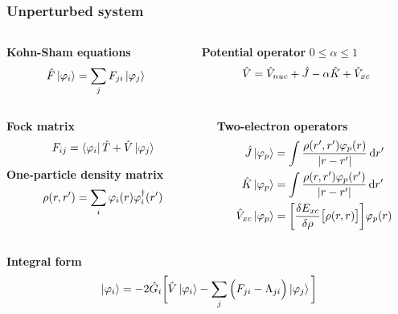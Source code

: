 \begin{frame}
    \frametitle{Unperturbed system}
    \begin{columns}
    \begin{column}[b]{0.5\linewidth}
    \centering
    \textbf{Kohn-Sham equations}
    \begin{equation}
        \nonumber
        \hat{F}\ket{\varphi_i} = \sum_j F_{ji}\ket{\varphi_j}
    \end{equation}
    \end{column}
    \begin{column}[b]{0.5\linewidth}
    \centering
    \textbf{Potential operator} $0 \leq \alpha \leq 1$
    \begin{equation}
        \nonumber
        \hat{V} = \hat{V}_{nuc} + \hat{J} - \alpha\hat{K} + \hat{V}_{xc}
    \end{equation}
    \end{column}
    \end{columns}

    \vspace{5mm}

    \begin{columns}
    \begin{column}[b]{0.5\linewidth}
    \centering
    \textbf{Fock matrix}
    \begin{equation}
        \nonumber
        F_{ij} = \bra{\varphi_i}\hat{T} + \hat{V}\ket{\varphi_j}
    \end{equation}

    \vspace{8mm}

    \textbf{One-particle density matrix}
    \begin{equation}
        \nonumber
        \rho(r,r') = \sum_i \varphi_i(r)\varphi_i^\dag(r')
    \end{equation}
    \end{column}
    \begin{column}[b]{0.5\linewidth}

    \centering
    \textbf{Two-electron operators}
    \begin{align}
        \nonumber
        \hat{J} \ket{\varphi_p} &= \int\frac{\rho(r',r')\varphi_p(r)}{|r-r'|} \,\mathrm{d} r'\\
        \nonumber
        \hat{K} \ket{\varphi_p} &= \int\frac{\rho(r,r')\varphi_p(r')}{|r-r'|} \,\mathrm{d} r'\\
        \nonumber
        \hat{V}_{xc} \ket{\varphi_p} &= \bigg[\frac{\delta E_{xc}}{\delta \rho}\big[\rho(r,r)\big]\bigg] \varphi_p(r) 
    \end{align}
    \end{column}
    \end{columns}

    \vspace{5mm}

    \centering
    \textbf{Integral form}
    \begin{equation}
        \nonumber
        \ket{\varphi_i} = -2\hat{G}_i\bigg[\hat{V}\ket{\varphi_i} -
        \sum_j \Big(F_{ji} - \Lambda_{ji}\Big)\ket{\varphi_j}\bigg]
    \end{equation}
\end{frame}

